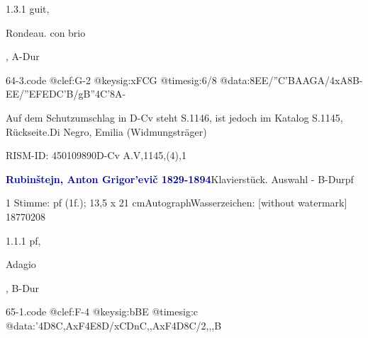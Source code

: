 \documentclass[a4paper, twocolumn, 11pt]{book}
\begin{document}
\newline %
\par 1.3.1  guit, \begin{itshape}Rondeau. con brio\end{itshape}, A-Dur  
\begin{filecontents*}{64-3.code}
@clef:G-2
@keysig:xFCG
@timesig:6/8
@data:{8EE}/''{C'BA}{AGA}/4xA8B-{EE}/''{EFE}{DC'B}/gB''4C'8A-
\end{filecontents*}

\newline %
\par Auf dem Schutzumschlag in D-Cv steht {\textquotedbl}S.1146{\textquotedbl}, ist jedoch im Katalog S.1145, Rückseite.\newline Di Negro, Emilia  (Widmungsträger)
\par RISM-ID: 450109890\newline D-Cv  A.V,1145,(4),1
\par \vspace{16pt} \textcolor{darkblue}{\textbf{Rubinštejn, Anton Grigor'evič  1829-1894}}\hfillplus{[65]}\newline Klavierstück. Auswahl - B-Dur\newline pf
\par \begin{itshape}\end{itshape} 
\par \textcolor{darkblue}{}  1 Stimme: pf  (1f.); 13,5 x 21 cm\newline Autograph\newline Wasserzeichen: [without watermark]  18770208
\par 1.1.1  pf, \begin{itshape}Adagio\end{itshape}, B-Dur  
\begin{filecontents*}{65-1.code}
@clef:F-4
@keysig:bBE
@timesig:c
@data:'4D8{C,A}xF4E8D/{xCDnC,,A}xF4D8C/2,,,B
\end{filecontents*}
\end{document}
